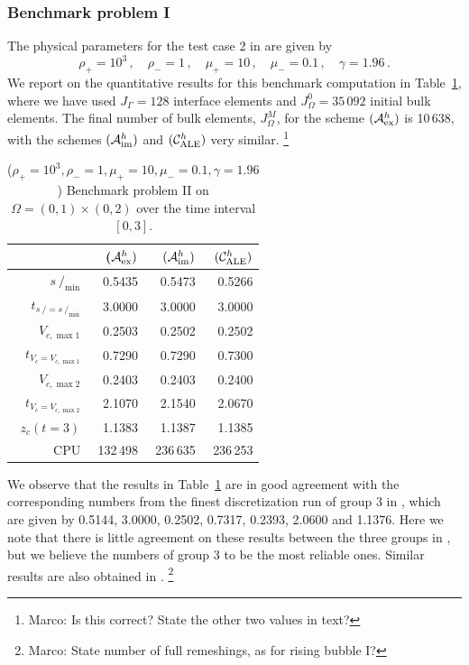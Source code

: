 \documentclass[a4paper,12pt,onecolumn]{article}
\newcommand{\strikes}{\mbox{$s\!\!\!\!\:/$}}
\newcommand{\schemeAex}{{\mathcal{A}^h_{\rm ex}}}
\newcommand{\schemeAim}{{\mathcal{A}^h_{\rm im}}}
\newcommand{\schemeALE}{{\mathcal{C}^h_{\rm ALE}}}
\begin{document}
\subsubsection{Benchmark problem I}

The physical parameters for the test case 2 in \cite[Table~I]{HysingTKPBGT09}
are given by
\begin{equation} \label{eq:Hysing2}
\rho_+ = 10^3\,,\quad \rho_- = 1\,,\quad \mu_+ = 10\,,\quad \mu_- = 0.1\,,\quad
\gamma = 1.96\,.
\end{equation}
We report on the quantitative results for this benchmark computation in
Table~\ref{tab:risingbubbleII}, where we have used
$J_\Gamma=128$ interface elements and $J_\Omega^0=35\,092$ initial
bulk elements. The final number of bulk
elements, $J_\Omega^M$, for the scheme $(\schemeAex)$ is 10\,638,
with the schemes $(\schemeAim)$ and $(\schemeALE)$ very similar.
\footnote{Marco: Is this correct? State the other two values in text?}
\begin{table}
\center
\hspace*{-3.25cm}
\begin{tabular}{rrrr}
\hline
& ($\schemeAex)$ & $(\schemeAim)$ & $(\schemeALE)$ \\
\hline
$\strikes_{\min}$                & 0.5435 & 0.5473 & 0.5266 \\
$t_{\strikes = \strikes_{\min}}$ & 3.0000 & 3.0000 & 3.0000 \\
$V_{c,\max 1}$                   & 0.2503 & 0.2502 & 0.2502 \\
$t_{V_c = V_{c,\max 1}}$         & 0.7290 & 0.7290 & 0.7300 \\
$V_{c,\max 2}$                   & 0.2403 & 0.2403 & 0.2400 \\
$t_{V_c = V_{c,\max 2}}$         & 2.1070 & 2.1540 & 2.0670 \\
$z_c(t=3)$                       & 1.1383 & 1.1387 & 1.1385 \\
CPU                              & 132\,498 & 236\,635 & 236\,253 \\
\hline
\end{tabular}
\hspace*{-3.25cm}
\caption{($\rho_+ = 10^3,\rho_- = 1,\mu_+ = 10,\mu_- =0.1,\gamma = 1.96$)
Benchmark problem II on $\Omega = (0,1) \times (0,2)$ over the time
interval $[0,3]$.}
\label{tab:risingbubbleII}
\end{table}%
We observe that the results in Table~\ref{tab:risingbubbleII}
are in good agreement with the corresponding numbers from the finest
discretization run of group 3 in \cite{HysingTKPBGT09}, which are given by
0.5144, 3.0000, 0.2502, 0.7317, 0.2393, 2.0600 and 1.1376. Here we note that
there is little agreement on these results between the three groups in
\cite{HysingTKPBGT09}, but we believe the numbers of group 3 to be the most
reliable ones. Similar results are also obtained in
\cite[Tables~5 and 6]{fluidfbp}.
\footnote{Marco: State number of full remeshings, as for rising bubble I?}
\end{document}
